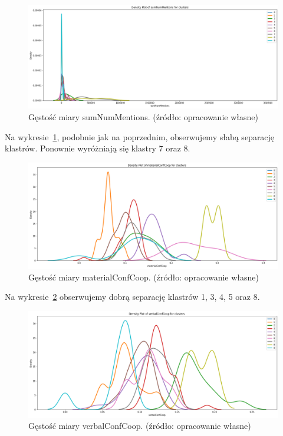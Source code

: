 \documentclass[11pt]{report}
\begin{document}
    \begin{figure}[!htp]
        \centering
        \includegraphics[width=\linewidth]{fig/CLUST/density_sumNumMentions.png}
        \caption{Gęstość miary sumNumMentions. (źródło: opracowanie własne)}
        \label{fig:density_sumnummentions}
    \end{figure}

    Na wykresie~\ref{fig:density_sumnummentions}, podobnie jak na poprzednim, obserwujemy słabą separację klastrów.
    Ponownie wyróżniają się klastry 7 oraz 8.

    \begin{figure}[!htp]
        \centering
        \includegraphics[width=\linewidth]{fig/CLUST/density_materialConfCoop.png}
        \caption{Gęstość miary materialConfCoop. (źródło: opracowanie własne)}
        \label{fig:density_materialconfcoop}
    \end{figure}

    Na wykresie~\ref{fig:density_materialconfcoop} obserwujemy dobrą separację klastrów 1, 3, 4, 5 oraz 8.

    \begin{figure}[!htp]
        \centering
        \includegraphics[width=\linewidth]{fig/CLUST/density_verbalConfCoop.png}
        \caption{Gęstość miary verbalConfCoop. (źródło: opracowanie własne)}
        \label{fig:density_verbalconfcoop}
    \end{figure}
\end{document}
